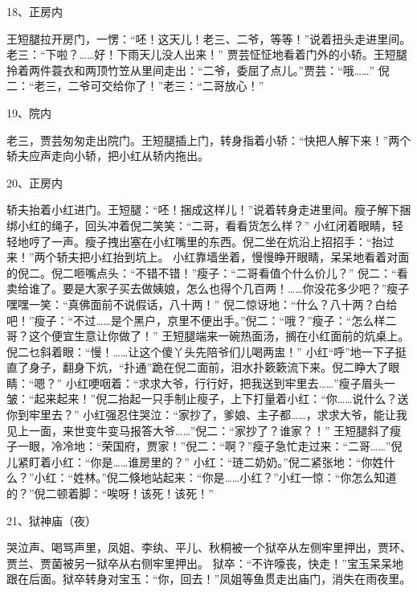 18、正房内\par
王短腿拉开房门，一愣：“呸！这天儿！老三、二爷，等等！”说着扭头走进里间。老三：“下啦？……好！下雨天儿没人出来！”
贾芸怔怔地看着门外的小轿。王短腿拎着两件蓑衣和两顶竹笠从里间走出：“二爷，委屈了点儿。”贾芸：“哦……”
倪二：“老三，二爷可交给你了！”老三：“二哥放心！”

19、院内\par
老三，贾芸匆匆走出院门。王短腿插上门，转身指着小轿：“快把人解下来！”两个轿夫应声走向小轿，把小红从轿内拖出。

20、正房内\par
轿夫抬着小红进门。王短腿：“呸！捆成这样儿！”说着转身走进里间。瘦子解下捆绑小红的绳子，回头冲着倪二笑笑：“二哥，看看货怎么样？”
小红闭着眼睛，轻轻地哼了一声。瘦子拽出塞在小红嘴里的东西。倪二坐在炕沿上招招手：“抬过来！”两个轿夫把小红抬到坑上。
小红靠墙坐着，慢慢睁开眼睛，呆呆地看着对面的倪二。倪二咂嘴点头：“不错不错！”瘦子：“二哥看值个什么价儿？”
倪二：“看卖给谁了。要是大家子买去做姨娘，怎么也得个几百两！……你没花多少吧？”瘦子嘿嘿一笑：“真佛面前不说假话，八十两！”
倪二惊讶地：“什么？八十两？白给吧！”瘦子：“不过……是个黑户，京里不便出手。”倪二：“哦？”瘦子：“怎么样二哥？这个便宜生意让你做了！”
王短腿端来一碗热面汤，搁在小红面前的炕桌上。倪二乜斜着眼：“慢！……让这个傻丫头先陪爷们儿喝两盅！”
小红“呼”地一下子挺直了身子，翻身下炕，“扑通”跪在倪二面前，泪水扑簌簌流下来。倪二睁大了眼睛：“嗯？”
小红哽咽着：“求求大爷，行行好，把我送到牢里去……”瘦子眉头一皱：“起来起来！”倪二抬起一只手制止瘦子，上下打量着小红：“你……说什么？送你到牢里去？”
小红强忍住哭泣：“家抄了，爹娘、主子都……，求求大爷，能让我见上一面，来世变牛变马报答大爷……”倪二：“家抄了？谁家？！”
王短腿斜了瘦子一眼，冷冷地：“荣国府，贾家！”倪二：“啊？”瘦子急忙走过来：“二哥……”倪儿紧盯着小红：“你是……谁房里的？”
小红：“琏二奶奶。”倪二紧张地：“你姓什么？”小红：“姓林。”倪二倏地站起来：“你是……小红？”小红一惊：“你怎么知道的？”倪二顿着脚：“唉呀！该死！该死！”

21、狱神庙（夜）\par
哭泣声、喝骂声里，凤姐、李纨、平儿、秋桐被一个狱卒从左侧牢里押出，贾环、贾兰、贾菌被另一狱卒从右侧牢里押出。
狱卒：“不许嚎丧，快走！”宝玉呆呆地跟在后面。狱卒转身对宝玉：“你，回去！”凤姐等鱼贯走出庙门，消失在雨夜里。

